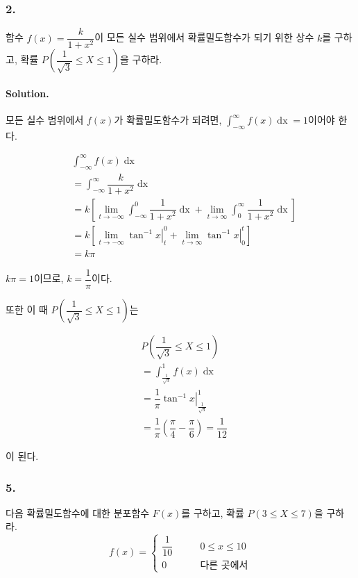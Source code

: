\subsubsection{2.} 함수 $f\left(x\right)=\dfrac{k}{1+x^2}$이 모든 실수 범위에서 확률밀도함수가 되기 위한 상수 $k$를 구하고, 확률 $P\left(\dfrac{1}{\sqrt{3}} \leq X \leq 1\right)$을 구하라.

\paragraph{Solution.} 모든 실수 범위에서 $f\left(x\right)$가 확률밀도함수가 되려면, $\displaystyle \int_{-\infty}^{\infty} f\left(x\right) \mathop{dx} = 1$이어야 한다.

\begin{align*}
	& \int_{-\infty}^{\infty} f\left(x\right) \mathop{dx}\\
	&= \int_{-\infty}^{\infty} \dfrac{k}{1+x^2} \mathop{dx}\\
	&= k \left[\lim_{t\rightarrow-\infty} \int_{-\infty}^{0} \dfrac{1}{1+x^2} \mathop{dx} + \lim_{t\rightarrow\infty} \int_{0}^{\infty} \dfrac{1}{1+x^2} \mathop{dx}\right]\\
	&= k \left[\lim_{t\rightarrow-\infty} \left.\tan^{-1}x\right|^0_t + \lim_{t\rightarrow\infty} \left.\tan^{-1}x\right|^t_0\right]\\
	&= k\pi
\end{align*}

$k\pi = 1$이므로, $k = \dfrac{1}{\pi}$이다.

또한 이 때 $P\left(\dfrac{1}{\sqrt{3}} \leq X \leq 1\right)$는 

\begin{align*}
	& P\left(\dfrac{1}{\sqrt{3}} \leq X \leq 1\right)\\
	&= \int_{\frac{1}{\sqrt{3}}}^{1} f\left(x\right) \mathop{dx}\\
	&= \dfrac{1}{\pi}\left.\tan^{-1}x\right|^1_{\frac{1}{\sqrt{3}}}\\
	&= \dfrac{1}{\pi}\left(\dfrac{\pi}{4} - \dfrac{\pi}{6}\right) = \dfrac{1}{12}
\end{align*}

이 된다.

\subsubsection{5.} 다음 확률밀도함수에 대한 분포함수 $F\left(x\right)$를 구하고, 확률 $P\left(3 \leq X \leq 7\right)$을 구하라.
\[f\left(x\right) = \left\{
\begin{array}{ll}
	\dfrac{1}{10} & \qquad 0\leq x\leq 10 \\
	0 & \qquad\textrm{다른 곳에서}
\end{array}
\right. \]

